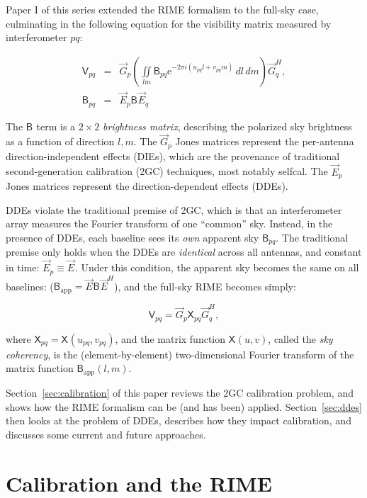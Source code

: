 \documentclass{aa}
\newcommand{\herm}{H}
\newcommand{\jones}[2]{\vec {#1}_{#2}}
\newcommand{\jonesT}[2]{\vec {#1}^{\herm}_{#2}}
\newcommand{\coh}[2]{\mathsf{{#1}}_{{#2}}}
\newcommand{\EDIT}[1]{#1}
\begin{document}
\EDIT{
Paper I of this series \citep{RRIME1} extended the RIME formalism \citep{ME1,ME4} to the full-sky case, culminating in the following equation for the visibility matrix measured by interferometer $pq$:
 
\begin{eqnarray}\label{eq:me-allsky}
\coh{V}{pq} & = & \jones{G}{p} \left( \iint\limits_{lm} \coh{B}{pq} \mathrm{e} ^{-2\pi i(u_{pq} l+v_{pq} m)} \,dl\,dm \right) \jonesT{G}{q}, \\
\nonumber \coh{B}{pq} & = & \jones{E}{p} \coh{B}{} \jones{E}{q}
\end{eqnarray}

The $\coh{B}{}$ term is a $2\times2$ {\em brightness matrix}, describing the polarized sky brightness as a function of direction $l,m$. The $\jones{G}{p}$ Jones matrices represent the per-antenna direction-independent effects (DIEs), which are the provenance of traditional second-generation calibration (2GC) techniques, most notably selfcal. The $\jones{E}{p}$ Jones matrices represent the direction-dependent effects (DDEs). 

DDEs violate the traditional premise of 2GC, which is that an interferometer array measures the Fourier transform of one ``common'' sky. Instead, in the presence of DDEs, each baseline sees its \emph{own} apparent sky $\coh{B}{pq}$. The traditional premise only holds when the DDEs are \emph{identical} across all antennas, and constant in time: $\jones{E}{p} \equiv \jones{E}{}$. Under this condition, the apparent sky becomes the same on all baselines: ($\coh{B}{\mathrm{app}} =  \jones{E}{} \coh{B}{} \jonesT{E}{}$), and the full-sky RIME becomes simply: 

\begin{equation}\label{eq:me-allsky-simple}
\coh{V}{pq} = \jones{G}{p} \coh{X}{pq} \jonesT{G}{q},
\end{equation}

where $\coh{X}{pq} = \coh{X}{}(u_{pq},v_{pq})$, and the matrix function $\coh{X}{}(u,v)$, called the {\em sky coherency}, is the (element-by-element) two-dimensional Fourier transform of the matrix function $\coh{B}{\mathrm{app}}(l,m)$.

Section~\ref{sec:calibration} of this paper reviews the 2GC calibration problem, and shows how the RIME formalism can be (and has been) applied. Section~\ref{sec:ddes} then looks at the problem of DDEs, describes how they impact calibration, and discusses some current and future approaches.
}

\section{\label{sec:calibration}Calibration and the RIME}
\end{document}
